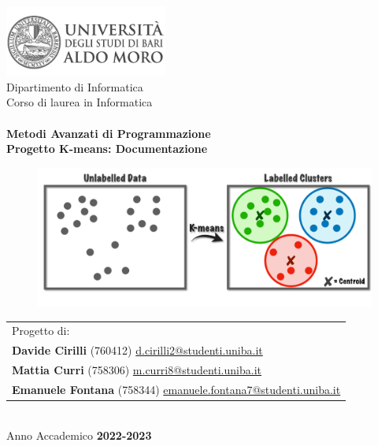 \begin{titlepage}
    \begin{center}
        \includegraphics[width=0.4\textwidth]{img/logo_uniba}\\
        \vspace{1cm}
        {\large Dipartimento di Informatica}\\
        \vspace{1cm}
        {\large Corso di laurea in Informatica}\\
        \hrulefill \\
        \vspace{2cm}
        {\large \textbf{Metodi Avanzati di Programmazione}}\\
        \vspace{2cm}
        {\LARGE\textbf{Progetto K-means: Documentazione}}\\
        \vspace{2cm}

        \vfill
        \begin{figure}[H]
            \centering
            \includegraphics[scale=0.3]{img/copertina.png}
        \end{figure}
    
        \begin{table}[ht]
          \centering
          \begin{tabularx}{\textwidth}{@{}X@{}}
              Progetto di: \\
              \textbf{Davide Cirilli} (760412) \href{mailto:d.cirilli2@studenti.uniba.it}{d.cirilli2@studenti.uniba.it} \\
              \textbf{Mattia Curri} (758306) \href{mailto:m.curri8@studenti.uniba.it}{m.curri8@studenti.uniba.it} \\
              \textbf{Emanuele Fontana} (758344) \href{mailto:emanuele.fontana7@studenti.uniba.it}{emanuele.fontana7@studenti.uniba.it}\\
          \end{tabularx}
      \end{table}

        \vspace{1cm}
        \hrulefill \\
        \vspace{1cm}
        {\large Anno Accademico \textbf{2022-2023}}
    \end{center}
\end{titlepage}